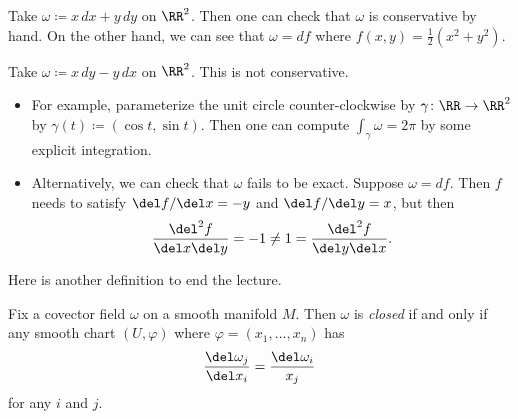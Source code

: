 \documentclass[../notes.tex]{subfiles}
\begin{document}
\begin{example}
	Take $\omega\coloneqq x\,dx+y\,dy$ on $\RR^2$. Then one can check that $\omega$ is conservative by hand. On the other hand, we can see that $\omega=df$ where $f(x,y)=\frac12\left(x^2+y^2\right)$.
\end{example}
\begin{example}
	Take $\omega\coloneqq x\,dy-y\,dx$ on $\RR^2$. This is not conservative.
	\begin{itemize}
		\item For example, parameterize the unit circle counter-clockwise by $\gamma\colon\RR\to\RR^2$ by $\gamma(t)\coloneqq(\cos t,\sin t)$. Then one can compute $\int_\gamma\omega=2\pi$ by some explicit integration.
		\item Alternatively, we can check that $\omega$ fails to be exact. Suppose $\omega=df$. Then $f$ needs to satisfy $\del f/\del x=-y$ and $\del f/\del y=x$, but then
		\[\frac{\del^2f}{\del x\del y}=-1\ne1=\frac{\del^2f}{\del y\del x}.\]
	\end{itemize}
\end{example}
Here is another definition to end the lecture.
\begin{definition}
	Fix a covector field $\omega$ on a smooth manifold $M$. Then $\omega$ is \textit{closed} if and only if any smooth chart $(U,\varphi)$ where $\varphi=(x_1,\ldots,x_n)$ has
	\[\frac{\del\omega_j}{\del x_i}=\frac{\del\omega_i}{x_j}\]
	for any $i$ and $j$.
\end{definition}
\end{document}
